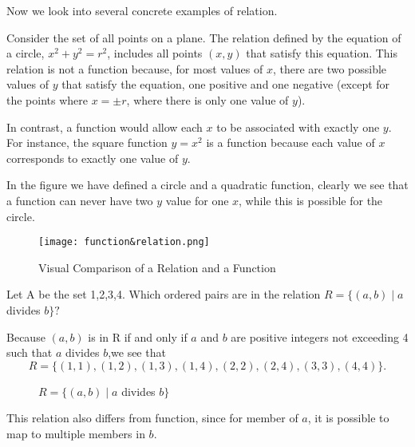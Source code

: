 Now we look into several concrete examples of relation.
\begin{example}
    Consider the set of all points on a plane. The relation defined by the equation of a circle, $x^2 + y^2 = r^2$, includes all points $(x, y)$ that satisfy this equation. This relation is not a function because, for most values of $x$, there are two possible values of $y$ that satisfy the equation, one positive and one negative (except for the points where $x = \pm r$, where there is only one value of $y$).
    
    In contrast, a function would allow each $x$ to be associated with exactly one $y$. For instance, the square function $y = x^2$ is a function because each value of $x$ corresponds to exactly one value of $y$.

    In the figure we have defined a circle and a quadratic function, clearly 
    we see that a function can never have two $y$ value for one $x$, while 
    this is possible for the circle.
    \end{example}
\begin{figure}[H]
    \centering
    \texttt{[image: function\&relation.png]}
    \caption{Visual Comparison of a Relation and a Function}
\end{figure}
\begin{example}
	Let A be the set {1,2,3,4}. Which ordered pairs are in the relation $R=\{(a,b)\mid a$ divides $b\}?$
	\begin{solution}
		 Because $(a,b)$ is in R if and only if $a$ and $b$ are positive integers not exceeding 4 such that $a$ divides $b$,we see that
		$$
		R=\{(1,1),(1,2),(1,3),(1,4),(2,2),(2,4),(3,3),(4,4)\}.
		$$
	\end{solution}
\begin{figure}[H]
	\centering
{}
\caption{$R=\{(a,b)\mid a$ divides $b\}$}
\end{figure}
This relation also differs from function, since for member of $a$, it is possible
to map to multiple members in $b$.
\end{example}
